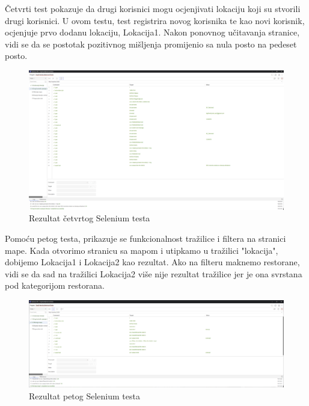         \textbf{}{Četvrti test pokazuje da drugi korisnici mogu ocjenjivati lokaciju koji su stvorili drugi korisnici. U ovom testu, test registrira novog korisnika te kao novi korisnik, ocjenjuje prvo dodanu lokaciju, Lokacija1. Nakon ponovnog učitavanja stranice, vidi se da se postotak pozitivnog mišljenja promijenio sa nula posto na pedeset posto.}

        \begin{figure}[H]
			    \includegraphics[width=\textwidth]{slike/passed-selenium4.png} 
			        \caption{Rezultat četvrtog Selenium testa}
			    \label{fig:Rezultat četvrtog Selenium testa}
		\end{figure}
        
        \textbf{}{Pomoću petog testa, prikazuje se funkcionalnost tražilice i filtera na stranici mape. Kada otvorimo stranicu sa mapom i utipkamo u tražilici "lokacija", dobijemo Lokacija1 i Lokacija2 kao rezultat. Ako na filteru maknemo restorane, vidi se da sad na tražilici Lokacija2 više nije rezultat tražilice jer je ona svrstana pod kategorijom restorana.}

        \begin{figure}[H]
			    \includegraphics[width=\textwidth]{slike/passed-selenium5.png} 
			        \caption{Rezultat petog Selenium testa}
			    \label{fig:Rezultat petog Selenium testa}
		\end{figure}

